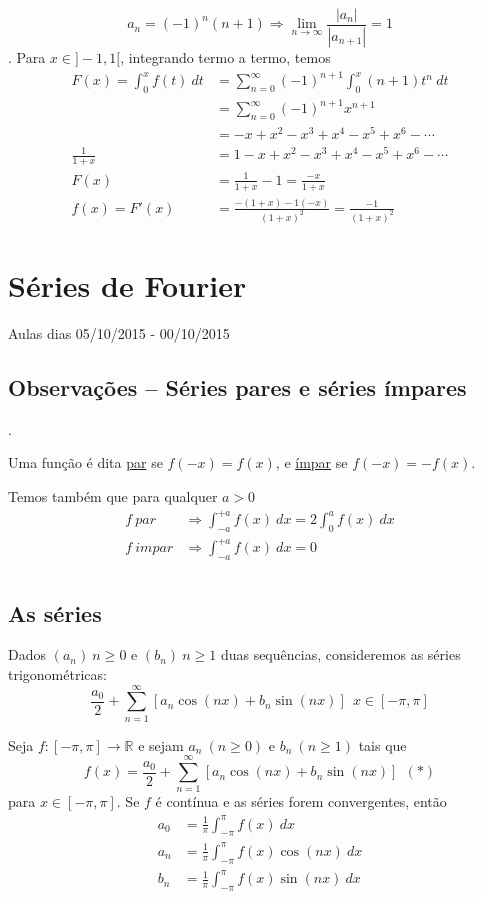 \documentclass[12pt,openany, letterpaper]{book}
\newcommand{\LI}[1][n]{\lim_{{#1} \rightarrow \infty}}
\newcommand{\soma}[2][n]{\sum_{{#1} = #2}^\infty}
\begin{document}
{{$$a_n = (-1)^n (n+1) \Rightarrow \LI \frac{|a_n|}{|a_{n+1}|} = 1$$. Para $x \in ]-1,1[$, integrando termo a termo, temos \begin{align*}
    F(x) = \int_0^x f(t) \ dt &= \soma{0} (-1)^{n+1} \int_0^x (n+1) t^{n} \ dt \\
    &= \soma{0} (-1)^{n+1} x^{n+1} \\
    &= -x + x^2 - x^3 + x^4 - x^5 + x^6 - \cdots \\
    \frac{1}{1+x} &= 1 - x + x^2 - x^3 + x^4 - x^5 + x^6 - \cdots \\
    F(x) &= \frac{1}{1+x} - 1 = \frac{-x}{1+x} \\
    f(x) = F'(x) &= \frac{-(1+x)-1(-x)}{(1+x)^2} = \frac{-1}{(1+x)^2}
\end{align*}


\chapter{Séries de Fourier}{Aulas dias 05/10/2015 - 00/10/2015}

\section{Observações -- Séries pares e séries ímpares}.

\hspace{5mm} Uma função é dita \underline{par} se $f(-x) = f(x)$, e \underline{ímpar} se $f(-x) = -f(x)$.

Temos também que para qualquer $a > 0$\begin{align*}
    f \ par &\Rightarrow \int_{-a}^{+a} f(x) \ dx = 2 \int_0^a f(x) \ dx \\
    f \ impar &\Rightarrow \int_{-a}^{+a} f(x) \ dx = 0 \\
\end{align*}

\section{As séries}

\hspace{5mm}Dados $(a_n) \ n \geq 0$ e $(b_n) \ n \geq 1$ duas sequências, consideremos as séries trigonométricas: $$\frac{a_0}{2} + \soma{1} [a_n \cos (nx)+ b_n\sin (nx)] \ \ x \in [-\pi, \pi]$$ 

Seja $f:[-\pi,\pi] \rightarrow \mathds{R}$ e sejam $a_n \ (n \geq 0)$ e $b_n \ (n \geq 1)$ tais que $$f(x) = \frac{a_0}{2} + \soma{1} [a_n\cos (nx) + b_n \sin (nx)] \ \ (*)$$ para $x \in [-\pi,\pi]$. Se $f$ é contínua e as séries forem convergentes, então \begin{align}
    a_0 &= \frac{1}{\pi}\int_{-\pi}^\pi f(x) \ dx \\
    a_n &= \frac{1}{\pi}\int_{-\pi}^\pi f(x)\cos (nx) \ dx \\
    b_n &= \frac{1}{\pi}\int_{-\pi}^\pi f(x)\sin (nx) \ dx
\end{align}

}}
\end{document}
